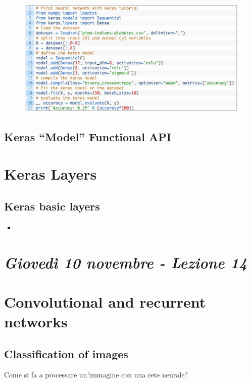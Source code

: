 \begin{figure}[ht]
	\centering
	\includegraphics[width=0.8\linewidth]{figure_ml/seq_ex.png}
\end{figure}
\FloatBarrier
\subsection{Keras “Model” Functional API}


\section{Keras Layers}
\subsection{Keras basic layers}

\begin{itemize}
	\item 
\end{itemize}



\section{\textit{Giovedì 10 novembre - Lezione 14}}

\section{Convolutional and recurrent networks}

\subsection{Classification of images}

Come si fa a processare un'immagine con una rete neurale?\\

